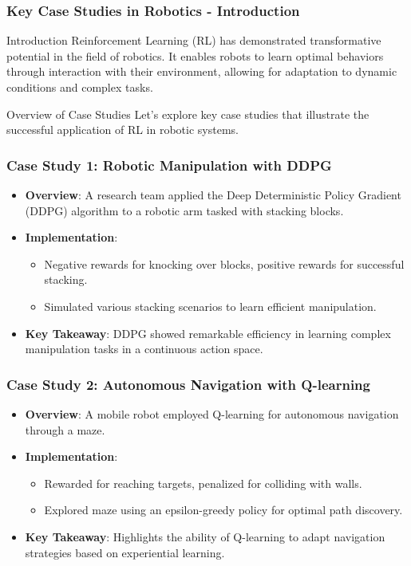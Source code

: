 \documentclass[aspectratio=169]{beamer}
\begin{document}
\begin{frame}[fragile]
    \frametitle{Key Case Studies in Robotics - Introduction}
    \begin{block}{Introduction}
        Reinforcement Learning (RL) has demonstrated transformative potential in the field of robotics. 
        It enables robots to learn optimal behaviors through interaction with their environment, allowing for adaptation to dynamic conditions and complex tasks.
    \end{block}
    \begin{block}{Overview of Case Studies}
        Let's explore key case studies that illustrate the successful application of RL in robotic systems.
    \end{block}
\end{frame}

\begin{frame}[fragile]
    \frametitle{Case Study 1: Robotic Manipulation with DDPG}
    \begin{itemize}
        \item \textbf{Overview}: A research team applied the Deep Deterministic Policy Gradient (DDPG) algorithm to a robotic arm tasked with stacking blocks.
        \item \textbf{Implementation}:
        \begin{itemize}
            \item Negative rewards for knocking over blocks, positive rewards for successful stacking.
            \item Simulated various stacking scenarios to learn efficient manipulation.
        \end{itemize}
        \item \textbf{Key Takeaway}: DDPG showed remarkable efficiency in learning complex manipulation tasks in a continuous action space.
    \end{itemize}
\end{frame}

\begin{frame}[fragile]
    \frametitle{Case Study 2: Autonomous Navigation with Q-learning}
    \begin{itemize}
        \item \textbf{Overview}: A mobile robot employed Q-learning for autonomous navigation through a maze.
        \item \textbf{Implementation}:
        \begin{itemize}
            \item Rewarded for reaching targets, penalized for colliding with walls.
            \item Explored maze using an epsilon-greedy policy for optimal path discovery.
        \end{itemize}
        \item \textbf{Key Takeaway}: Highlights the ability of Q-learning to adapt navigation strategies based on experiential learning.
    \end{itemize}
\end{frame}
\end{document}
